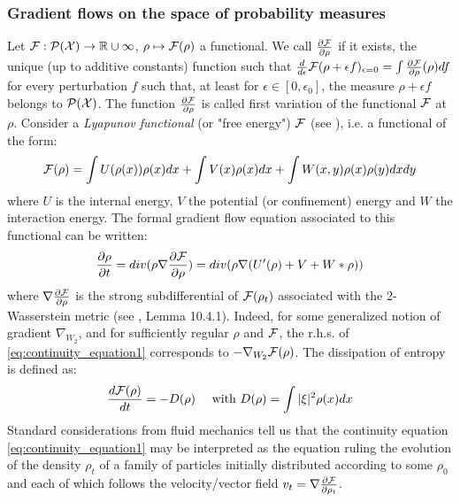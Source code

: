 \subsubsection{Gradient flows on the space of probability measures}\label{sec:gradient_flows_functionals}


Let ${{\mathcal F}} : \mathcal{P}({{\mathcal X}}) \rightarrow {{\mathbb R}} \cup \infty$, $\rho \mapsto {{\mathcal F}}(\rho)$ a functional. We call $\frac{\partial{{{\mathcal F}}}}{\partial{\rho}}$ if it exists, the unique (up to additive constants) function such that $\frac{d}{d\epsilon}{{\mathcal F}}(\rho+\epsilon  f)_{\epsilon=0}=\int\frac{\partial{{{\mathcal F}}}}{\partial{\rho}}(\rho) df$ for every perturbation $f$ such that, at least for $\epsilon \in [0, \epsilon_0]$, the measure $\rho +\epsilon f$ belongs to $\mathcal{P}({{\mathcal X}})$. The function $\frac{\partial{{{\mathcal F}}}}{\partial{\rho}}$ is called first variation of the functional ${{\mathcal F}}$ at $\rho$. Consider a 
\textit{Lyapunov functional} 
(or "free energy") ${{\mathcal F}}$ 
(see \cite{Villani:2004}), 
i.e. a functional of the form:
\begin{equation}\label{eq:lyapunov}
{{\mathcal F}}(\rho)=\int U(\rho(x)) \rho(x)dx + \int V(x)\rho(x)dx + \int W(x,y)\rho(x)\rho(y)dxdy
\end{equation}
where  $U$ is the internal energy, $V$ the potential (or confinement) energy and $W$ the
interaction energy. The formal gradient flow equation associated to this functional can be written:
\begin{equation}\label{eq:continuity_equation1}
\frac{\partial \rho}{\partial t}= div( \rho \nabla \frac{\partial {{\mathcal F}}}{\partial \rho})=div( \rho \nabla (U'(\rho) + V + W * \rho))
\end{equation}
where $\nabla \frac{\partial {{\mathcal F}}}{\partial \rho}$ is the strong subdifferential of ${{\mathcal F}}(\rho_t)$ associated with the 2-Wasserstein
metric (see \cite{ambrosio2008gradient}, Lemma 10.4.1). Indeed, for some generalized notion of gradient $\nabla_{W_2}$, and for sufficiently regular $\rho$ and ${{\mathcal F}}$, the r.h.s. of \eqref{eq:continuity_equation1} corresponds to $-\nabla_{W_2}{{\mathcal F}}(\rho)$.
The dissipation of entropy is defined as: %
\begin{align}
       \frac{d {{\mathcal F}}(\rho)}{dt} =-D(\rho) \quad \text{ with } D(\rho)= \int |\xi|^2 \rho(x)dx
\end{align}
Standard considerations from fluid mechanics tell us that the continuity equation \eqref{eq:continuity_equation1} may be interpreted as the equation ruling the evolution of the density $\rho_t$ of a family of particles initially distributed according to some $\rho_0$ and each of which follows the velocity/vector field $v_t=\nabla \frac{\partial{{{\mathcal F}}}}{\partial{\rho_t}}$.


